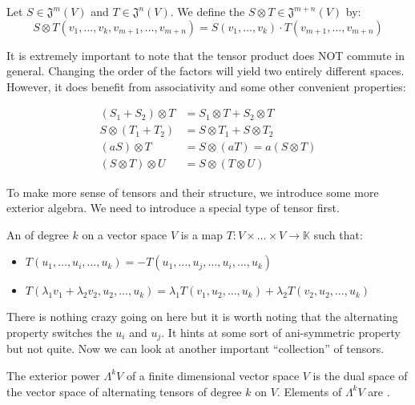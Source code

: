 \begin{definition}
    Let $S \in \mathfrak{J}^m(V)$ and $T \in \mathfrak{J}^n(V)$. We define the
     $S \otimes T \in \mathfrak{J}^{m+n}(V)$ by:
    \begin{equation*}
        S \otimes T (v_1, \hdots, v_k, v_{m+1}, \hdots, v_{m+n}) =
        S(v_1, \hdots, v_k) \cdot T(v_{m+1}, \hdots, v_{m+n})
    \end{equation*}
\end{definition}

It is extremely important to note that the tensor product does NOT commute in general.
Changing the order of the factors will yield two entirely different spaces. However,
it does benefit from associativity and some other convenient properties:

\begin{align*}
    (S_1 + S_2) \otimes T &= S_1 \otimes T + S_2 \otimes T\\
    S \otimes (T_1 + T_2) &= S \otimes T_1 + S \otimes T_2\\
    (aS) \otimes T &= S \otimes (aT) = a(S \otimes T)\\
    (S \otimes T) \otimes U &= S \otimes (T \otimes U)
\end{align*}

To make more sense of tensors and their structure, we introduce some more exterior
algebra. We need to introduce a special type of tensor first.

\begin{definition}
    An  of degree $k$ on a vector space $V$ is a map
    $T: V \times \hdots \times V \to \mathbb{K}$ such that:
    \begin{itemize}
        \item $T(u_1,\hdots,u_i,\hdots,u_k) = -T(u_1,\hdots,u_j,\hdots,u_i,\hdots,u_k)$
        \item $T(\lambda_1 v_1 + \lambda_2 v_2, u_2, \hdots, u_k) = \lambda_1T(
        v_1,u_2,\hdots,u_k) + \lambda_2 T(v_2,u_2,\hdots,u_k)$
    \end{itemize}
\end{definition}

There is nothing crazy going on here but it is worth noting that the alternating
property switches the $u_i$ and $u_j$. It hints at some sort of ani-symmetric property
but not quite. Now we can look at another important ``collection'' of tensors.

\begin{definition}
    The  exterior power $\Lambda^kV$ of a finite dimensional vector
    space $V$ is the dual space of the vector space of alternating tensors of degree
    $k$ on $V$. Elements of $\Lambda^kV$ are .
\end{definition}

